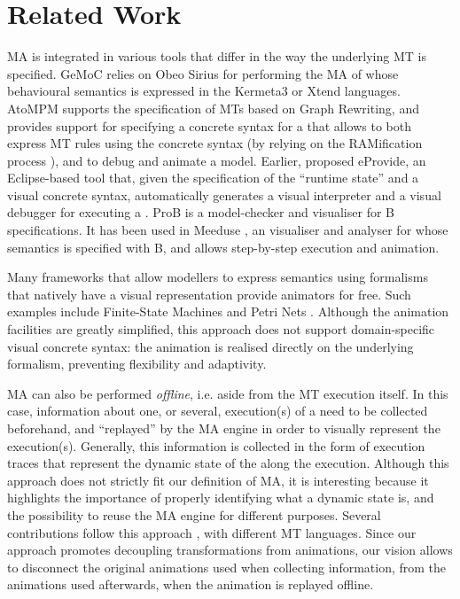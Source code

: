 \section{Related Work}
\label{sec:RW}

MA is integrated in various tools that differ in the way the underlying MT is specified.
GeMoC \citep{combemale2016tool} relies on Obeo Sirius for performing the MA of 
\DSLs whose behavioural semantics is expressed in the Kermeta3 or Xtend languages.
AtoMPM \cite{Syriani-Vangheluwe-etAl:2013} supports the specification of MTs
based on Graph Rewriting, and provides support for specifying a concrete syntax
for a \DSL that allows to both express MT rules using the concrete syntax (by
relying on the RAMification process \cite{Kuehne-Mezei-etAl:2009}), and to 
debug and animate a model. Earlier, \citet{Sadilek-Wachsmuth:2008} proposed eProvide,
an Eclipse-based tool that, given the specification of the ``runtime state''
and a visual concrete syntax, automatically generates a visual interpreter and a 
visual debugger for executing a \DSL. ProB \cite{leuschel2008prob} is a model-checker
and visualiser for B specifications. It has been used in Meeduse \cite{idani2020meeduse},
an visualiser and analyser for \DSLs whose semantics is specified with B, and allows
step-by-step execution and animation.

Many frameworks that allow modellers to express \DSL semantics using formalisms
that natively have a visual representation provide animators for free. Such examples
include Finite-State Machines \cite{Das2016SupportingTM,Goldsby-etAl:2006,Bandener-etAl:2010}
and Petri Nets \cite{mosteller2019integrated,Palanque-etAl:2009,Wimmer-etAl:2009}.
Although the animation facilities are greatly simplified, this approach does
not support domain-specific visual concrete syntax: the animation is realised 
directly on the underlying formalism, preventing flexibility and adaptivity.

MA can also be performed \emph{offline}, i.e. aside from the MT execution itself.
In this case, information about one, or several, execution(s) of a \DSL need to
be collected beforehand, and ``replayed'' by the MA engine in order to visually
represent the execution(s). Generally, this information is collected in the form
of execution traces \cite{J:Hojaji-Mayerhofer-etAl:2019} that represent the dynamic
state of the \DSL along the execution. Although this approach does not strictly 
fit our definition of MA, it is interesting because it highlights the importance
of properly identifying what a dynamic state is, and the possibility to reuse
the MA engine for different purposes. Several contributions follow this approach
\cite{J:Hegedues-Rath-Varro:2012,Guin-Syriani:2013,idani2021formal}, with different
MT languages. Since our approach promotes decoupling transformations from animations,
our vision allows to disconnect the original animations used when collecting information,
from the animations used afterwards, when the animation is replayed offline. 

